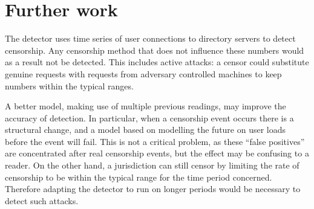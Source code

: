 \documentclass{article}
\begin{document}
\section{Further work}

The detector uses time series of user connections to directory servers to
detect censorship.
Any censorship method that does not influence these numbers would as a
result not be detected.
This includes active attacks: a censor could substitute genuine requests
with requests from adversary controlled machines to keep numbers within
the typical ranges.

A better model, making use of multiple previous readings, may improve the
accuracy of detection.
In particular, when a censorship event occurs there is a structural
change, and a model based on modelling the future on user loads before the
event will fail.
This is not a critical problem, as these ``false positives'' are
concentrated after real censorship events, but the effect may be confusing
to a reader.
On the other hand, a jurisdiction can still censor by limiting the rate of
censorship to be within the typical range for the time period concerned.
Therefore adapting the detector to run on longer periods would be
necessary to detect such attacks.
\end{document}
